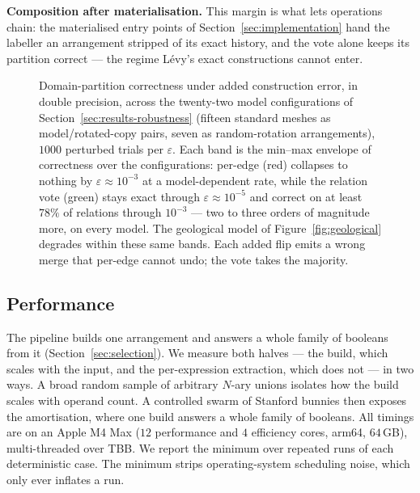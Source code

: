 \documentclass{egpubl}
\begin{document}
\textbf{Composition after materialisation.} This margin is what lets operations chain: the materialised entry points of Section~\ref{sec:implementation} hand the labeller an arrangement stripped of its exact history, and the vote alone keeps its partition correct --- the regime L\'evy's exact constructions cannot enter.

\begin{figure}[t]
\centering

\caption{Domain-partition correctness under added construction error, in double precision, across the twenty-two model configurations of Section~\ref{sec:results-robustness} (fifteen standard meshes as model/rotated-copy pairs, seven as random-rotation arrangements), $1000$ perturbed trials per $\varepsilon$. Each band is the min--max envelope of correctness over the configurations: per-edge (red) collapses to nothing by $\varepsilon \approx 10^{-3}$ at a model-dependent rate, while the relation vote (green) stays exact through $\varepsilon \approx 10^{-5}$ and correct on at least $78\%$ of relations through $10^{-3}$ --- two to three orders of magnitude more, on every model. The geological model of Figure~\ref{fig:geological} degrades within these same bands. Each added flip emits a wrong merge that per-edge cannot undo; the vote takes the majority.}
\label{fig:robustness}
\end{figure}

\subsection{Performance}
\label{sec:results-performance}

The pipeline builds one arrangement and answers a whole family of booleans from it (Section~\ref{sec:selection}). We measure both halves --- the build, which scales with the input, and the per-expression extraction, which does not --- in two ways. A broad random sample of arbitrary $N$-ary unions isolates how the build scales with operand count. A controlled swarm of Stanford bunnies then exposes the amortisation, where one build answers a whole family of booleans. All timings are on an Apple M4 Max ($12$ performance and $4$ efficiency cores, arm64, $64$\,GB), multi-threaded over TBB. We report the minimum over repeated runs of each deterministic case. The minimum strips operating-system scheduling noise, which only ever inflates a run.
\end{document}
